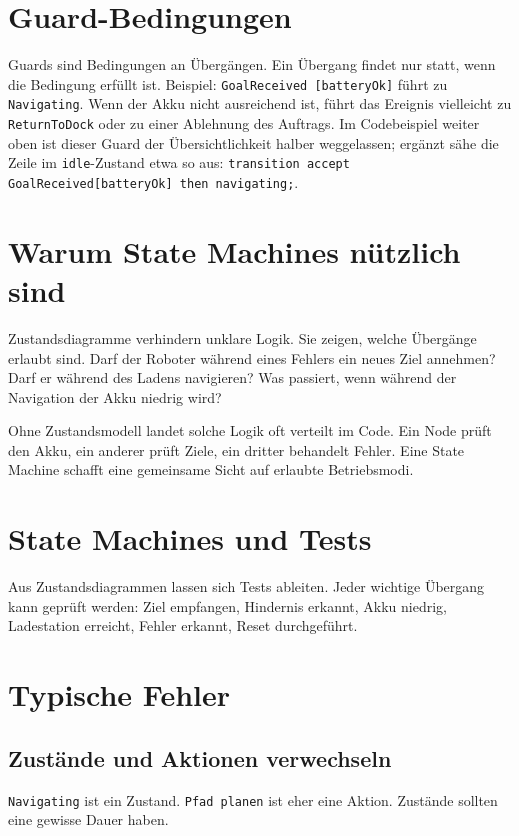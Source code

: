 \section{Guard-Bedingungen}
Guards sind Bedingungen an Übergängen. Ein Übergang findet nur statt, wenn die Bedingung erfüllt ist. Beispiel: \texttt{GoalReceived [batteryOk]} führt zu \texttt{Navigating}. Wenn der Akku nicht ausreichend ist, führt das Ereignis vielleicht zu \texttt{ReturnToDock} oder zu einer Ablehnung des Auftrags. Im Codebeispiel weiter oben ist dieser Guard der Übersichtlichkeit halber weggelassen; ergänzt sähe die Zeile im \texttt{idle}-Zustand etwa so aus: \texttt{transition accept GoalReceived[batteryOk] then navigating;}.

\section{Warum State Machines nützlich sind}
Zustandsdiagramme verhindern unklare Logik. Sie zeigen, welche Übergänge erlaubt sind. Darf der Roboter während eines Fehlers ein neues Ziel annehmen? Darf er während des Ladens navigieren? Was passiert, wenn während der Navigation der Akku niedrig wird?

\begin{praxisbox}
Ohne Zustandsmodell landet solche Logik oft verteilt im Code. Ein Node prüft den Akku, ein anderer prüft Ziele, ein dritter behandelt Fehler. Eine State Machine schafft eine gemeinsame Sicht auf erlaubte Betriebsmodi.
\end{praxisbox}

\section{State Machines und Tests}
Aus Zustandsdiagrammen lassen sich Tests ableiten. Jeder wichtige Übergang kann geprüft werden: Ziel empfangen, Hindernis erkannt, Akku niedrig, Ladestation erreicht, Fehler erkannt, Reset durchgeführt.

\section{Typische Fehler}
\subsection{Zustände und Aktionen verwechseln}
\texttt{Navigating} ist ein Zustand. \texttt{Pfad planen} ist eher eine Aktion. Zustände sollten eine gewisse Dauer haben.

